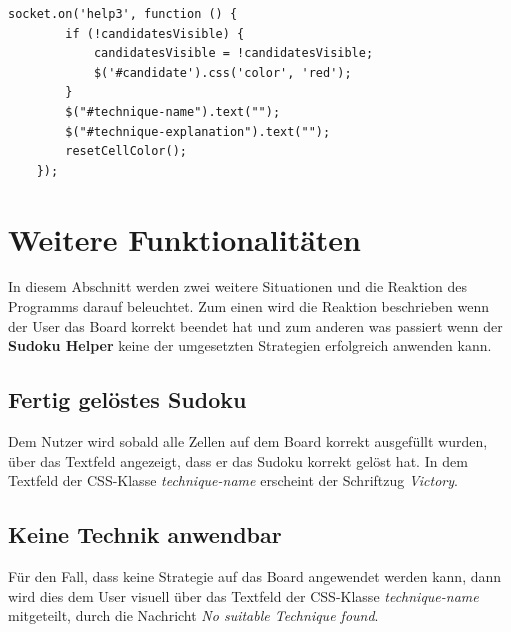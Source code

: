 \begin{lstlisting}[caption={Vierte Hilfestellung}, label={lst:help3}]
	socket.on('help3', function () {
		if (!candidatesVisible) {
			candidatesVisible = !candidatesVisible;
			$('#candidate').css('color', 'red');
		}
		$("#technique-name").text("");
		$("#technique-explanation").text("");
		resetCellColor();
	});

\end{lstlisting}

\section{Weitere Funktionalitäten}
In diesem Abschnitt werden zwei weitere Situationen und die Reaktion des Programms darauf beleuchtet. Zum einen wird die Reaktion beschrieben wenn der User das Board korrekt beendet hat und zum anderen was passiert wenn der \textbf{Sudoku Helper} keine der umgesetzten Strategien erfolgreich anwenden kann.

\subsection{Fertig gelöstes Sudoku}
Dem Nutzer wird sobald alle Zellen auf dem Board korrekt ausgefüllt wurden, über das Textfeld angezeigt, dass er das Sudoku korrekt gelöst hat. In dem Textfeld der CSS-Klasse \textit{technique-name} erscheint der Schriftzug \textit{Victory}.

\subsection{Keine Technik anwendbar}
Für den Fall, dass keine Strategie auf das Board angewendet werden kann, dann wird dies dem User visuell über das Textfeld der CSS-Klasse \textit{technique-name} mitgeteilt, durch die Nachricht \textit{No suitable Technique found}. 